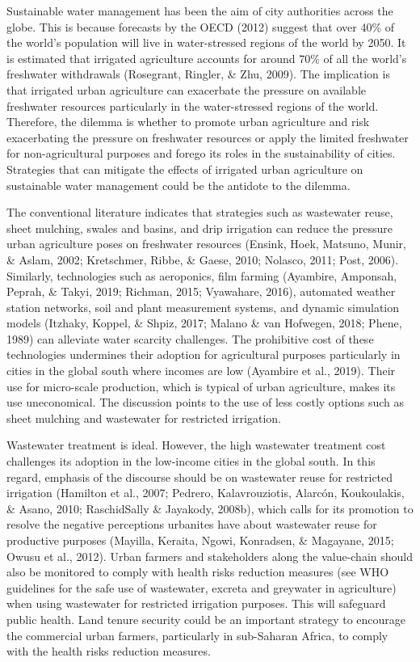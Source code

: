 Sustainable water management has been the aim of city authorities across the globe. This is because forecasts by the OECD (2012) suggest that over 40\% of the world's population will live in water-stressed regions of the world by 2050. It is estimated that irrigated agriculture accounts for around 70\% of all the world's freshwater withdrawals (Rosegrant, Ringler, \& Zhu, 2009). The implication is that irrigated urban agriculture can exacerbate the pressure on available freshwater resources particularly in the water-stressed regions of the world. Therefore, the dilemma is whether to promote urban agriculture and risk exacerbating the pressure on freshwater resources or apply the limited freshwater for non-agricultural purposes and forego its roles in the sustainability of cities. Strategies that can mitigate the effects of irrigated urban agriculture on sustainable water management could be the antidote to the dilemma.

The conventional literature indicates that strategies such as wastewater reuse, sheet mulching, swales and basins, and drip irrigation can reduce the pressure urban agriculture poses on freshwater resources (Ensink, Hoek, Matsuno, Munir, \& Aslam, 2002; Kretschmer, Ribbe, \& Gaese, 2010; Nolasco, 2011; Post, 2006). Similarly, technologies such as aeroponics, film farming (Ayambire, Amponsah, Peprah, \& Takyi, 2019; Richman, 2015; Vyawahare, 2016), automated weather station networks, soil and plant measurement systems, and dynamic simulation models (Itzhaky, Koppel, \& Shpiz, 2017; Malano \& van Hofwegen, 2018; Phene, 1989) can alleviate water scarcity challenges. The prohibitive cost of these technologies undermines their adoption for agricultural purposes particularly in cities in the global south where incomes are low (Ayambire et al., 2019). Their use for micro-scale production, which is typical of urban agriculture, makes its use uneconomical. The discussion points to the use of less costly options such as sheet mulching and wastewater for restricted irrigation.

Wastewater treatment is ideal. However, the high wastewater treatment cost challenges its adoption in the low-income cities in the global south. In this regard, emphasis of the discourse should be on wastewater reuse for restricted irrigation (Hamilton et al., 2007; Pedrero, Kalavrouziotis, Alarcón, Koukoulakis, \& Asano, 2010; RaschidSally \& Jayakody, 2008b), which calls for its promotion to resolve the negative perceptions urbanites have about wastewater reuse for productive purposes (Mayilla, Keraita, Ngowi, Konradsen, \& Magayane, 2015; Owusu et al., 2012). Urban farmers and stakeholders along the value-chain should also be monitored to comply with health risks reduction measures (see WHO guidelines for the safe use of wastewater, excreta and greywater in agriculture) when using wastewater for restricted irrigation purposes. This will safeguard public health. Land tenure security could be an important strategy to encourage the commercial urban farmers, particularly in sub-Saharan Africa, to comply with the health risks reduction measures.

